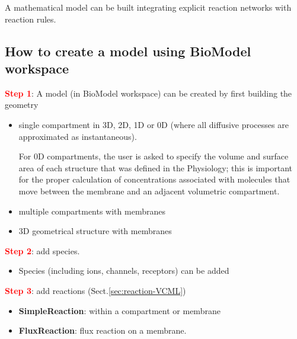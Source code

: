 A mathematical model can be built integrating explicit reaction networks with
reaction rules.



\subsection{How to create a model using BioModel workspace}

\textcolor{red}{\bf Step 1}:
A model (in BioModel workspace) can be created by first building the geometry
\begin{itemize}
  \item single compartment in 3D, 2D, 1D or 0D (where all diffusive processes
  are approximated as instantaneous).


For 0D compartments, the user is asked to specify the volume and surface area of
each structure that was defined in the Physiology; this is important for the
proper calculation of concentrations associated with molecules that move between
the membrane and an adjacent volumetric compartment.
  
  \item multiple compartments with membranes
  
  
  \item 3D geometrical structure with membranes
\end{itemize}

\textcolor{red}{\bf Step 2}: add species.
\begin{itemize}
  \item Species (including ions, channels, receptors) can be added
  
\end{itemize}

\textcolor{red}{\bf Step 3}: add reactions (Sect.\ref{sec:reaction-VCML})
\begin{itemize}
  \item {\bf SimpleReaction}: within a compartment or membrane 
  
  
  \item {\bf FluxReaction}: flux reaction on a membrane.
\end{itemize}

